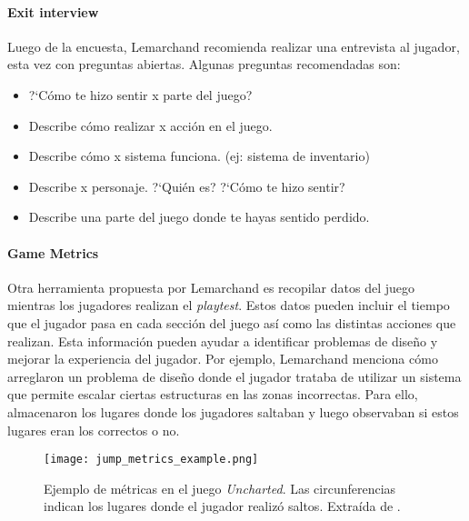 \paragraph{Exit interview} Luego de la encuesta, Lemarchand recomienda realizar una entrevista al jugador, esta vez con preguntas abiertas. Algunas preguntas recomendadas son:
\begin{itemize}
    \item ?`Cómo te hizo sentir x parte del juego?
    \item Describe cómo realizar x acción en el juego.
    \item Describe cómo x sistema funciona. (ej: sistema de inventario)
    \item Describe x personaje. ?`Quién es? ?`Cómo te hizo sentir?
    \item Describe una parte del juego donde te hayas sentido perdido.
\end{itemize}
\paragraph{Game Metrics} Otra herramienta propuesta por Lemarchand es recopilar datos del juego mientras los jugadores realizan el \textit{playtest}. Estos datos pueden incluir el tiempo que el jugador pasa en cada sección del juego así como las distintas acciones que realizan. Esta información pueden ayudar a identificar problemas de diseño y mejorar la experiencia del jugador. Por ejemplo, Lemarchand menciona cómo arreglaron un problema de diseño donde el jugador trataba de utilizar un sistema que permite escalar ciertas estructuras en las zonas incorrectas. Para ello, almacenaron los lugares donde los jugadores saltaban y luego observaban si estos lugares eran los correctos o no.
\begin{figure}[H]
    \centering
    \texttt{[image: jump\_metrics\_example.png]}
    \caption{Ejemplo de métricas en el juego \textit{Uncharted}. Las circunferencias indican los lugares donde el jugador realizó saltos. Extraída de \cite{lemarchandPlayfulProductionProcess2021}.}
    \label{fig:x metricas de salto Uncharted Lemarchand}
\end{figure}
%
%
